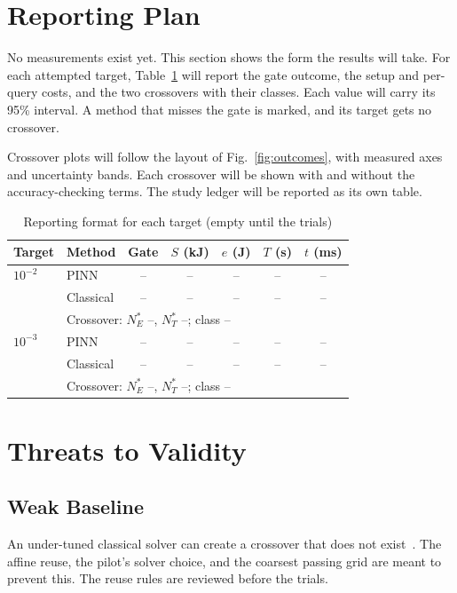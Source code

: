 \documentclass[journal]{IEEEtran}
\newcommand{\Nstar}{N^{\ast}}
\begin{document}
\section{Reporting Plan}\label{sec:report}

No measurements exist yet. This section shows the form the results will take. For each attempted target, Table~\ref{tab:results} will report the gate outcome, the setup and per-query costs, and the two crossovers with their classes. Each value will carry its 95\% interval. A method that misses the gate is marked, and its target gets no crossover.

Crossover plots will follow the layout of Fig.~\ref{fig:outcomes}, with measured axes and uncertainty bands. Each crossover will be shown with and without the accuracy-checking terms. The study ledger will be reported as its own table.

\begin{table}[t]
\caption{Reporting format for each target (empty until the trials)}
\label{tab:results}
\centering
\footnotesize
\setlength{\tabcolsep}{2.6pt}
\begin{tabular}{@{}llccccc@{}}
\toprule
Target & Method & Gate & $S$ (kJ) & $e$ (J) & $T$ (s) & $t$ (ms) \\
\midrule
$10^{-2}$ & PINN      & -- & -- & -- & -- & -- \\
          & Classical & -- & -- & -- & -- & -- \\
          & \multicolumn{6}{l}{Crossover: $\Nstar_E$ --, $\Nstar_T$ --; class --} \\
\midrule
$10^{-3}$ & PINN      & -- & -- & -- & -- & -- \\
          & Classical & -- & -- & -- & -- & -- \\
          & \multicolumn{6}{l}{Crossover: $\Nstar_E$ --, $\Nstar_T$ --; class --} \\
\bottomrule
\end{tabular}
\end{table}

\section{Threats to Validity}\label{sec:threats}

\subsection{Weak Baseline}
An under-tuned classical solver can create a crossover that does not exist~\cite{mcgreivy2024}. The affine reuse, the pilot's solver choice, and the coarsest passing grid are meant to prevent this. The reuse rules are reviewed before the trials.
\end{document}
